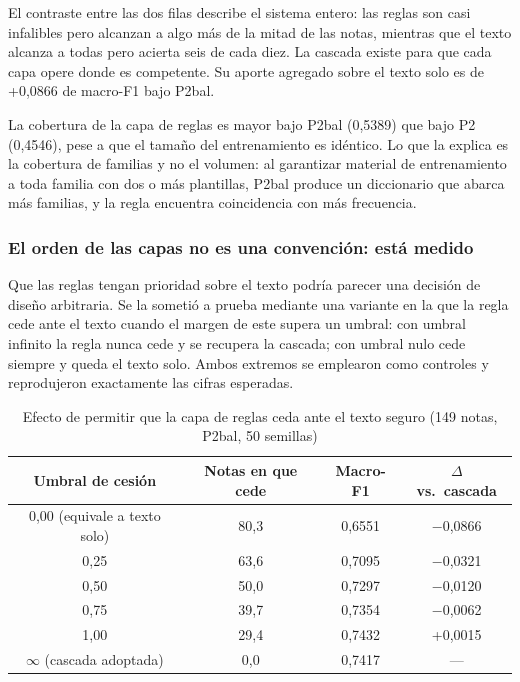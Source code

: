 El contraste entre las dos filas describe el sistema entero: las reglas son casi infalibles pero alcanzan a algo más de la mitad de las notas, mientras que el texto alcanza a todas pero acierta seis de cada diez. La cascada existe para que cada capa opere donde es competente. Su aporte agregado sobre el texto solo es de +0,0866 de macro-F1 bajo P2bal.

La cobertura de la capa de reglas es mayor bajo P2bal (0,5389) que bajo P2 (0,4546), pese a que el tamaño del entrenamiento es idéntico. Lo que la explica es la cobertura de familias y no el volumen: al garantizar material de entrenamiento a toda familia con dos o más plantillas, P2bal produce un diccionario que abarca más familias, y la regla encuentra coincidencia con más frecuencia.

\subsubsection*{El orden de las capas no es una convención: está medido}

Que las reglas tengan prioridad sobre el texto podría parecer una decisión de diseño arbitraria. Se la sometió a prueba mediante una variante en la que la regla cede ante el texto cuando el margen de este supera un umbral: con umbral infinito la regla nunca cede y se recupera la cascada; con umbral nulo cede siempre y queda el texto solo. Ambos extremos se emplearon como controles y reprodujeron exactamente las cifras esperadas.

\begin{table}[ht]
\centering
\caption{Efecto de permitir que la capa de reglas ceda ante el texto seguro (149 notas, P2bal, 50 semillas)}
\label{tab:cesion}
\begin{tabular}{|c|c|c|c|}
\hline
\textbf{Umbral de cesión} & \textbf{Notas en que cede} & \textbf{Macro-F1} & \textbf{$\Delta$ vs.\ cascada} \\
\hline
0,00 (equivale a texto solo) & 80,3 & 0,6551 & $-$0,0866 \\
0,25 & 63,6 & 0,7095 & $-$0,0321 \\
0,50 & 50,0 & 0,7297 & $-$0,0120 \\
0,75 & 39,7 & 0,7354 & $-$0,0062 \\
1,00 & 29,4 & 0,7432 & +0,0015 \\
$\infty$ (cascada adoptada) & 0,0 & 0,7417 & --- \\
\hline
\end{tabular}
\end{table}

